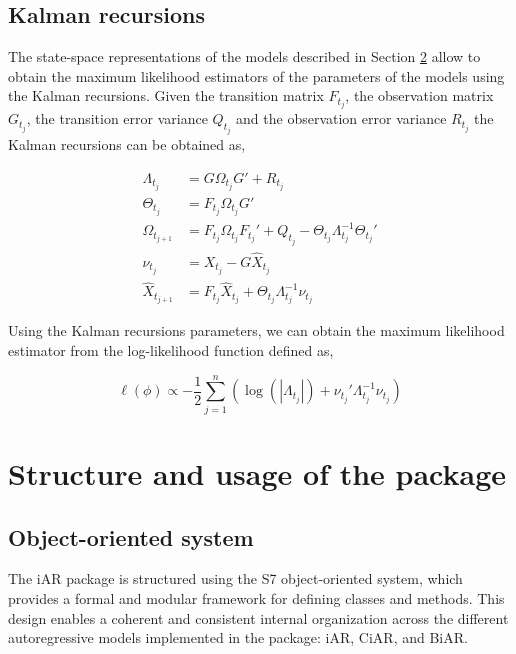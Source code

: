 \subsection{Kalman recursions}\label{kalman-recursions}

The state-space representations of the models described in Section \hyperref[models]{2} allow to obtain the maximum likelihood estimators of the parameters of the models using the Kalman recursions. Given the transition matrix \(F_{t_j}\), the observation matrix \(G_{t_j}\), the transition error variance \(Q_{t_j}\) and the observation error variance \(R_{t_j}\) the Kalman recursions can be obtained as,

\begin{equation} 
\begin{split}
\Lambda_{t_j} &= G \Omega_{t_j} G' + R_{t_j} \\
\Theta_{t_j} &= F_{t_j}\Omega_{t_j} G' \\
\Omega_{t_{j+1}} &= F_{t_j} \Omega_{t_j} F_{t_j}' + Q_{t_j}  - \Theta_{t_j} \Lambda_{t_j}^{-1} \Theta_{t_j}' \\
\nu_{t_j}  &= X_{t_j} - G \hat{X}_{t_j}\\
\hat{X}_{t_{j+1}}  &= F_{t_j} \hat{X}_{t_j} +  \Theta_{t_j} \Lambda_{t_j}^{-1} \nu_{t_j}
\end{split}
\label{eq:Kalman}
\end{equation}

Using the Kalman recursions parameters, we can obtain the maximum likelihood estimator from the log-likelihood function defined as,

\begin{equation}
\ell(\phi) \propto  - \frac{1}{2} \mathop{\sum}\limits_{j=1}^n \left( \log (|\Lambda_{t_j}|) + \nu_{t_j}' \Lambda_{t_j}^{-1} \nu_{t_j} \right)
\end{equation}

\section{\texorpdfstring{Structure and usage of the  package}{Structure and usage of the  package}}\label{sec:usage}

\subsection{Object-oriented system}\label{object-oriented-system}

The iAR package is structured using the S7 object-oriented system, which provides a formal and modular framework for defining classes and methods. This design enables a coherent and consistent internal organization across the different autoregressive models implemented in the package: iAR, CiAR, and BiAR.

